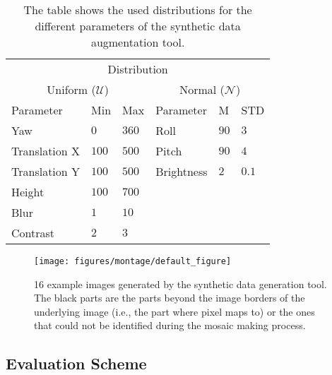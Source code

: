 \begin{table}[h!]
  \centering
  \begin{tabular}{llllll}
    \toprule
    \multicolumn{6}{c}{Distribution}                                                         \\
    \multicolumn{3}{c}{Uniform ($\mathcal{U}$)} & \multicolumn{3}{c}{Normal ($\mathcal{N}$)} \\
    \cmidrule(r){1-3}\cmidrule(r){4-6}
    Parameter                                   & Min   & Max   & Parameter  & M    & STD    \\
    \cmidrule(r){1-3}\cmidrule(r){4-6}
    Yaw                                         & $0$   & $360$ & Roll       & $90$ & $3$    \\
    Translation X                               & $100$ & $500$ & Pitch      & $90$ & $4$    \\
    Translation Y                               & $100$ & $500$ & Brightness & $2$  & $0.1$  \\
    Height                                      & $100$ & $700$ &            &      &        \\
    Blur                                        & $1$   & $10$  &            &      &        \\
    Contrast                                    & $2$   & $3$   &            &      &        \\
    \bottomrule
  \end{tabular}
  \caption[Distributions for the different
  parameters of the synthetic data augmentation tool.]{The table shows the used distributions for the different
    parameters of the synthetic data augmentation tool.}
  \label{tab:distributions}

\end{table}

\begin{figure}[h!]
\begin{center}
\texttt{[image: figures/montage/default\_figure]}
\caption{{\label{fig:montage} 16 example images generated by the synthetic data generation
    tool. The black parts are the parts beyond the image borders of
    the underlying image (i.e., the part where pixel maps to) or the
    ones that could not be identified during the mosaic making
    process.%
}}
\end{center}
\end{figure}

\subsection{Evaluation Scheme}
\label{sec:evaluationscheme}

